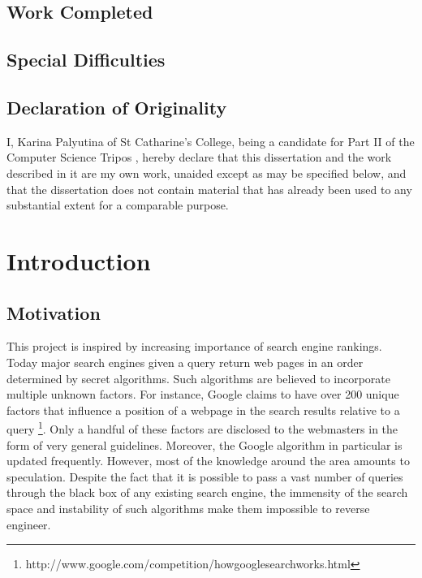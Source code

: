 \documentclass[12pt,notitlepage,twoside]{scrreprt}
\begin{document}
\section*{Work Completed}


\section*{Special Difficulties}

\section*{Declaration of Originality}

I, Karina Palyutina of St Catharine's College, being a candidate for Part II of the Computer
Science Tripos , hereby declare
that this dissertation and the work described in it are my own work,
unaided except as may be specified below, and that the dissertation
does not contain material that has already been used to any substantial
extent for a comparable purpose.

\bigskip
{}

\medskip
{}

\cleardoublepage

\tableofcontents



\cleardoublepage        %

\setcounter{page}{1}
\pagestyle{headings}

\chapter{Introduction}
\section{Motivation}
This project is inspired by increasing importance of search engine rankings.
Today major search engines given a query return web pages in an order
determined by secret algorithms. Such algorithms are believed 
to incorporate multiple unknown factors.
For instance, Google claims to have over 200 unique factors that influence a
position of a webpage in the search results relative to a query
\footnote{http://www.google.com/competition/howgooglesearchworks.html}. Only
a handful of these factors are disclosed to the webmasters  in the form of very
general guidelines. Moreover, the Google algorithm in particular is updated
frequently. However, most of the knowledge around the area amounts to
speculation. Despite the fact that it is possible to pass a vast number of
queries through the black box of any existing search engine, the immensity of
the search space and instability of such algorithms make them impossible to
reverse engineer.
\end{document}
